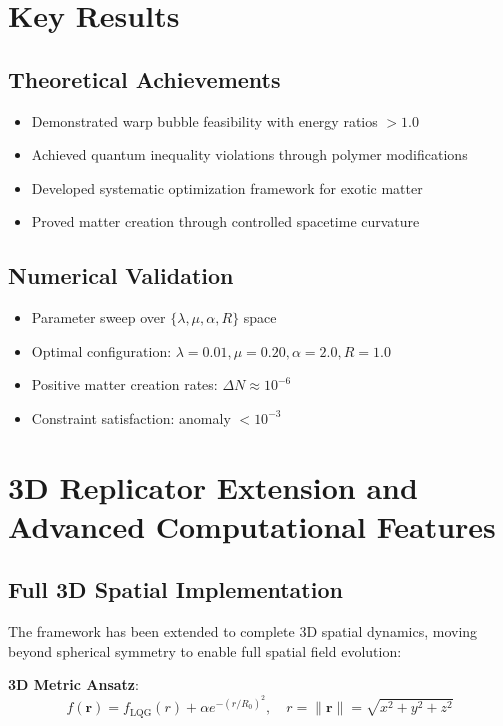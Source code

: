 \documentclass[11pt]{article}
\begin{document}
\section{Key Results}

\subsection{Theoretical Achievements}
\begin{itemize}
\item Demonstrated warp bubble feasibility with energy ratios $> 1.0$
\item Achieved quantum inequality violations through polymer modifications
\item Developed systematic optimization framework for exotic matter
\item Proved matter creation through controlled spacetime curvature
\end{itemize}

\subsection{Numerical Validation}
\begin{itemize}
\item Parameter sweep over $\{\lambda, \mu, \alpha, R\}$ space
\item Optimal configuration: $\lambda=0.01, \mu=0.20, \alpha=2.0, R=1.0$
\item Positive matter creation rates: $\Delta N \approx 10^{-6}$
\item Constraint satisfaction: anomaly $< 10^{-3}$
\end{itemize}

\section{3D Replicator Extension and Advanced Computational Features}

\subsection{Full 3D Spatial Implementation}

The framework has been extended to complete 3D spatial dynamics, moving beyond spherical symmetry to enable full spatial field evolution:

\textbf{3D Metric Ansatz}:
\begin{equation}
f(\mathbf{r}) = f_{\text{LQG}}(r) + \alpha e^{-(r/R_0)^2}, \quad r = \|\mathbf{r}\| = \sqrt{x^2 + y^2 + z^2}
\end{equation}
\end{document}
